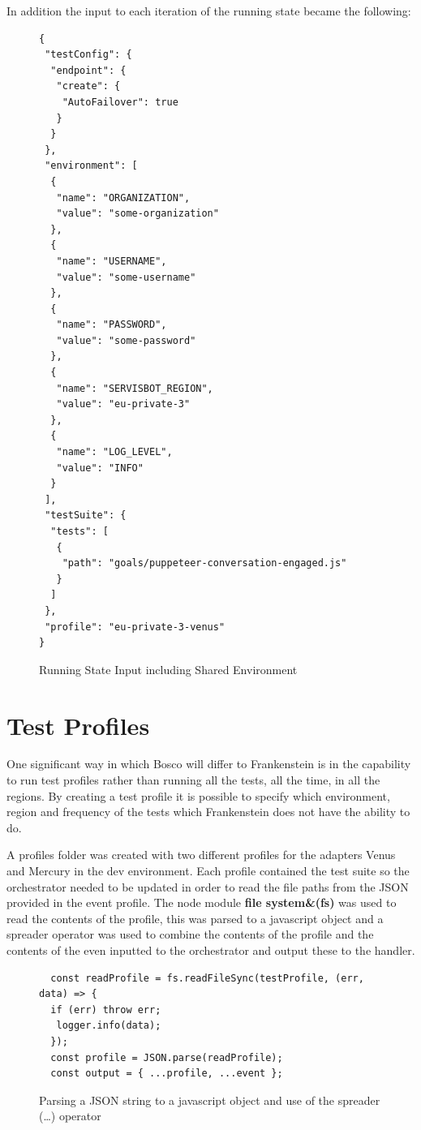 \documentclass[12pt,a4paper,titlepage]{report}
\begin{document}
In addition the input to each iteration of the running state became the following:

\begin{figure}[H]
 \begin{tcolorbox}
  \begin{verbatim}
{
 "testConfig": {
  "endpoint": {
   "create": {
    "AutoFailover": true
   }
  }
 },
 "environment": [
  {
   "name": "ORGANIZATION",
   "value": "some-organization"
  },
  {
   "name": "USERNAME",
   "value": "some-username"
  },
  {
   "name": "PASSWORD",
   "value": "some-password"
  },
  {
   "name": "SERVISBOT_REGION",
   "value": "eu-private-3"
  },
  {
   "name": "LOG_LEVEL",
   "value": "INFO"
  }
 ],
 "testSuite": {
  "tests": [
   {
    "path": "goals/puppeteer-conversation-engaged.js"
   }
  ]
 },
 "profile": "eu-private-3-venus"
}

\end{verbatim}
 \end{tcolorbox}
 \caption{Running State Input including Shared Environment}
\end{figure}

\section{Test Profiles}
One significant way in which Bosco will differ to Frankenstein is in the capability to run test profiles rather than 
running all the tests, all the time, in all the regions. By creating a test profile it is possible to specify which 
environment, region and frequency of the tests which Frankenstein does not have the ability to do. 

A profiles folder was created with two different profiles for the adapters Venus and Mercury in the dev environment. Each profile 
contained the test suite so the orchestrator needed to be updated in order to read the file paths from the JSON provided in the 
event profile. The node module \textbf{file system\&(fs)} was used to read the contents of the profile, this was parsed to 
a javascript object and a spreader operator was used to combine the contents of the profile and the contents of 
the even inputted to the orchestrator and output these to the handler.

\begin{figure}[H]
 \begin{tcolorbox}
  \begin{verbatim}
  const readProfile = fs.readFileSync(testProfile, (err, data) => {
  if (err) throw err;
   logger.info(data);
  });
  const profile = JSON.parse(readProfile);
  const output = { ...profile, ...event };
  \end{verbatim}
 \end{tcolorbox}
 \caption{Parsing a JSON string to a javascript object and use of the spreader (\dots) operator}
\end{figure}
\end{document}
